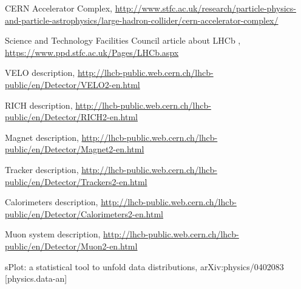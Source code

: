 \documentclass[english]{uzhpub}
\begin{document}
\begin{thebibliography}{100}

   CERN Accelerator Complex,
  \url{http://www.stfc.ac.uk/research/particle-physics-and-particle-astrophysics/large-hadron-collider/cern-accelerator-complex/}

   Science and Technology Facilities Council article about LHCb ,
  \url{https://www.ppd.stfc.ac.uk/Pages/LHCb.aspx}

   VELO description,
  \url{http://lhcb-public.web.cern.ch/lhcb-public/en/Detector/VELO2-en.html}

   RICH description,
  \url{http://lhcb-public.web.cern.ch/lhcb-public/en/Detector/RICH2-en.html}

   Magnet description,
  \url{http://lhcb-public.web.cern.ch/lhcb-public/en/Detector/Magnet2-en.html}

   Tracker description,
  \url{http://lhcb-public.web.cern.ch/lhcb-public/en/Detector/Trackers2-en.html}

   Calorimeters description,
  \url{http://lhcb-public.web.cern.ch/lhcb-public/en/Detector/Calorimeters2-en.html}

   Muon system description,
  \url{http://lhcb-public.web.cern.ch/lhcb-public/en/Detector/Muon2-en.html}

   sPlot: a statistical tool to unfold data distributions,
  	arXiv:physics/0402083 [physics.data-an]

\end{thebibliography}

%   
%
%
%   
%
%
\end{document}
